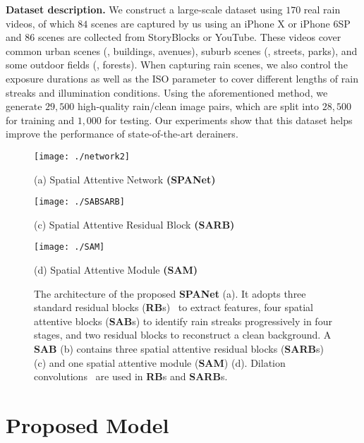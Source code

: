 \documentclass[10pt,twocolumn,letterpaper]{article}
\begin{document}
{\bf Dataset description.} We construct a large-scale dataset using $170$ real rain videos, of which $84$ scenes are captured by us using an iPhone X or iPhone 6SP
and $86$ scenes are collected from StoryBlocks or YouTube.
These videos cover common urban scenes (\eg, buildings, avenues), suburb scenes (\eg, streets, parks), and some outdoor fields (\eg, forests). When capturing rain scenes, we also control the exposure durations as well as the ISO parameter to cover different lengths of rain streaks and illumination conditions.
Using the aforementioned method, we generate $29,500$ high-quality rain/clean image pairs, which are split into $28,500$ for training and $1,000$ for testing. Our experiments show that this dataset helps improve the performance of state-of-the-art derainers.

\begin{figure*}[htbp]
\begin{minipage}[t]{\textwidth}
\centering
\texttt{[image: ./network2]}
\centerline{\footnotesize (a) Spatial Attentive Network \textbf{(SPANet)}}
\end{minipage}
\space{}
\begin{minipage}[t]{0.4\textwidth}
\centering
\texttt{[image: ./SABSARB]}
\centerline{\footnotesize (c) Spatial Attentive Residual Block \textbf{(SARB)}}
\end{minipage}
\begin{minipage}[t]{0.6\textwidth}
\centering
\texttt{[image: ./SAM]}	
\centerline{\footnotesize (d) Spatial Attentive Module \textbf{(SAM)}}
\end{minipage}
\space{\ }
\caption{The architecture of the proposed \textbf{SPANet} (a). It adopts three standard residual blocks ({\bf RB}s)~\cite{he:cvpr:2016:resnet} to extract features, four spatial attentive blocks ({\bf SAB}s) to identify rain streaks progressively in four stages, and two residual blocks to reconstruct a clean background. A {\bf SAB} (b) contains three spatial attentive residual blocks ({\bf SARB}s) (c) and one spatial attentive module ({\bf SAM}) (d). Dilation convolutions~\cite{yu:iclr:2015:dilated} are used in {\bf RB}s and {\bf SARB}s.}
\label{fig:network}
\vspace{-3mm}
\end{figure*}



\section{Proposed Model}\label{sec:spanet}
\end{document}
